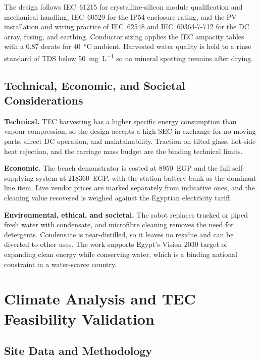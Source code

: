 \documentclass[12pt,a4paper]{report}   %
\begin{document}
The design follows IEC~61215 for crystalline-silicon module qualification and
mechanical handling, IEC~60529 for the IP54 enclosure rating, and the PV installation
and wiring practice of IEC~62548 and IEC~60364-7-712 for the DC array, fusing, and
earthing. Conductor sizing applies the IEC ampacity tables with a 0.87 derate for
\SI{40}{\degreeCelsius} ambient. Harvested water quality is held to a rinse standard of
TDS below \SI{50}{\milli\gram\per\liter} so no mineral spotting remains after drying.

\section{Technical, Economic, and Societal Considerations}

\textbf{Technical.} TEC harvesting has a higher specific energy consumption than
vapour compression, so the design accepts a high SEC in exchange for no moving parts,
direct DC operation, and maintainability. Traction on tilted glass, hot-side heat
rejection, and the carriage mass budget are the binding technical limits.

\textbf{Economic.} The bench demonstrator is costed at \num{8950}~EGP and the full
self-supplying system at \num{218360}~EGP, with the station battery bank as the
dominant line item. Live vendor prices are marked separately from indicative ones, and
the cleaning value recovered is weighed against the Egyptian electricity tariff.

\textbf{Environmental, ethical, and societal.} The robot replaces trucked or piped
fresh water with condensate, and microfibre cleaning removes the need for detergents.
Condensate is near-distilled, so it leaves no residue and can be diverted to other uses.
The work supports Egypt's Vision 2030 target of expanding clean energy while conserving
water, which is a binding national constraint in a water-scarce country.

\chapter{Climate Analysis and TEC Feasibility Validation}
\label{ch:climate}

\section{Site Data and Methodology}
\end{document}
